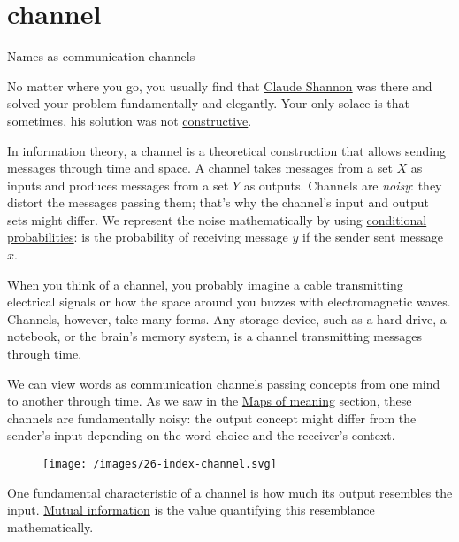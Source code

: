 \documentclass{article}
\begin{document}
\section{channel}{Names as communication channels}

No matter where you go, you usually find that \href{https://en.wikipedia.org/wiki/Claude_Shannon}{Claude Shannon} was there and solved your problem fundamentally and elegantly.
Your only solace is that sometimes, his solution was not \href{https://en.wikipedia.org/wiki/Constructive_proof}{constructive}.

In information theory,
a channel is a theoretical construction that allows sending messages through time and space.
A channel takes messages from a set $X$ as inputs and produces messages from a set $Y$ as outputs.
Channels are \emph{noisy}:
they distort the messages passing them;
that's why the channel's input and output sets might differ.
We represent the noise mathematically by using \href{https://en.wikipedia.org/wiki/Conditional_probability}{conditional probabilities}:
is the probability of receiving message $y$ if the sender sent message $x$.

When you think of a channel,
you probably imagine a cable transmitting electrical signals or how the space around you buzzes with electromagnetic waves.
Channels, however, take many forms.
Any storage device,
such as a hard drive, a notebook, or the brain's memory system,
is a channel transmitting messages through time.

We can view words as communication channels passing concepts from one mind to another through time.
As we saw in the \href{#maps-of-meaning}{Maps of meaning} section,
these channels are fundamentally noisy:
the output concept might differ from the sender's input depending on the word choice and the receiver's context.

\begin{figure}[grayscale-diagram]
  \texttt{[image: /images/26-index-channel.svg]}
\end{figure}

One fundamental characteristic of a channel is how much its output resembles the input.
\href{https://en.wikipedia.org/wiki/Mutual_information}{Mutual information} is the value quantifying this resemblance mathematically.
\end{document}
